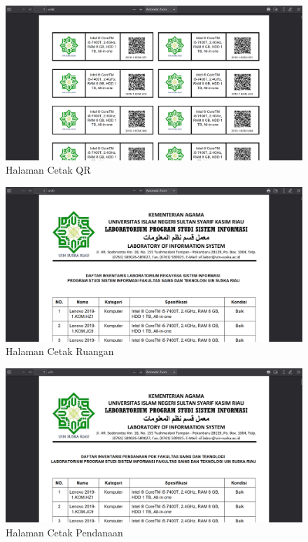 \begin{enumerate}
        \begin{figure}
          \centering
          \includegraphics[width=0.82\linewidth]{konten//gambar/barang cetak qr.png}
          \caption{Halaman Cetak QR}
          \label{fig:enter-label}
        \end{figure}

        \begin{figure}
          \centering
          \includegraphics[width=0.82\linewidth]{konten//gambar/barang cetak ruangan pdf.png}
          \caption{Halaman Cetak Ruangan}
          \label{fig:enter-label}
        \end{figure}

        \begin{figure}
          \centering
          \includegraphics[width=0.82\linewidth]{konten//gambar/barang cetak pendanaan pdf.png}
          \caption{Halaman Cetak Pendanaan}
          \label{fig:enter-label}
        \end{figure}


\end{enumerate}
